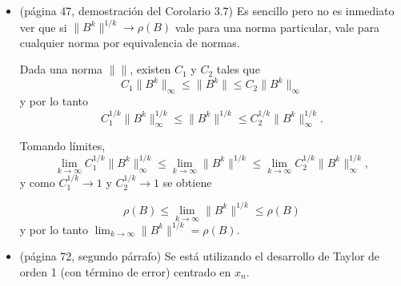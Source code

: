 \documentclass[12pt]{article}
\def\C{\mathbb{C}}
\def \R{\mathbb{R}}
\begin{document}
\begin{itemize}
\begin{proof}
 Para el caso $K = \R$, fijamos una norma inducida $N_\C$ en $\C^{n\times n}$ y sea $N_\R$ la restricci\'on a $\R^{n \times n}$. Es f\'acil ver que $N_\R$ es una norma en $\R^{n \times n}$ (verifica los axiomas de norma), aunque no necesariamente es una norma inducida.

 Dada ahora una norma inducida $\|\ \|$ en $\R^{n \times n}$, tenemos por la equivalencia de normas en cualquier espacio vectorial de dimensi\'on finita que
  \[
  \rho(A)^k = \rho(A^k) \le N_\C(A^k) = N_\R(A^k) \le C \|A^k\| \le C \| A\|^k,
 \]
 para alguna constante $C > 0$. Por lo tanto,
\[
 \rho(A) \le C^{1/k} \|A\|
\]
y tomando l\'imite $k \rightarrow \infty$ de ambos lados, obtenemos $\rho(A) \le \|A\|$.


\end{proof}


\item (p\'agina 47, demostraci\'on del Corolario 3.7) Es sencillo pero no es inmediato ver que si $\|B^k\|^{1/k} \rightarrow \rho(B)$ vale para una norma particular, vale para cualquier norma por equivalencia de normas. 
    
    Dada una norma $\| \|$, existen $C_1$ y $C_2$ tales que
    \[
    C_1 \|B^k\|_\infty \le \|B^k\| \le C_2 \|B^k\|_\infty
    \]
    y por lo tanto
    \[
    C_1^{1/k} \|B^k\|_\infty^{1/k} \le \|B^k\|^{1/k} \le C_2^{1/k} \|B^k\|_\infty^{1/k}.
    \]

    Tomando l\'imites,
    \[
    \lim_{k \rightarrow \infty} C_1^{1/k} \|B^k\|_\infty^{1/k} \le \lim_{k \rightarrow \infty} \|B^k\|^{1/k} \le \lim_{k \rightarrow \infty} C_2^{1/k} \|B^k\|_\infty^{1/k},
    \]
    y como $C_1^{1/k} \rightarrow 1$ y $C_2^{1/k} \rightarrow 1$ se obtiene

    \[
    \rho(B) \le \lim_{k \rightarrow \infty} \|B^k\|^{1/k} \le \rho(B)
    \]
    y por lo tanto $\lim_{k \rightarrow \infty} \|B^k\|^{1/k} = \rho(B)$.

    \item (p\'agina 72, segundo p\'arrafo) Se est\'a utilizando el desarrollo de Taylor de orden 1 (con t\'ermino de error) centrado en $x_n$.
    \end{itemize}
\end{document}
